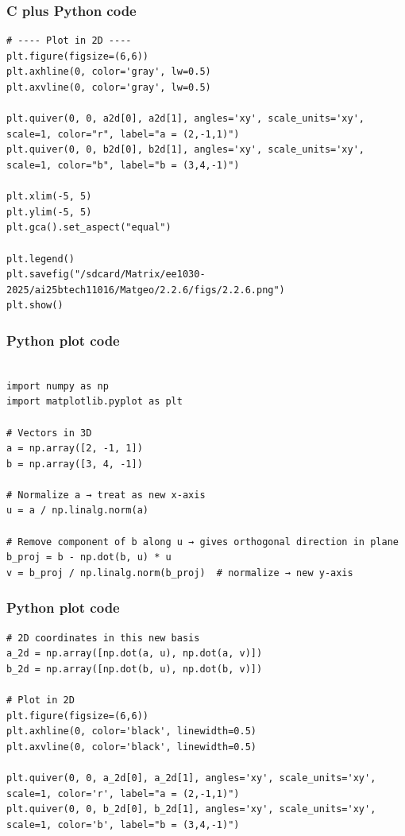 \documentclass{beamer}
\begin{document}
\begin{frame}[fragile]
    \frametitle{C plus Python code}
    \begin{lstlisting}
# ---- Plot in 2D ----
plt.figure(figsize=(6,6))
plt.axhline(0, color='gray', lw=0.5)
plt.axvline(0, color='gray', lw=0.5)

plt.quiver(0, 0, a2d[0], a2d[1], angles='xy', scale_units='xy', scale=1, color="r", label="a = (2,-1,1)")
plt.quiver(0, 0, b2d[0], b2d[1], angles='xy', scale_units='xy', scale=1, color="b", label="b = (3,4,-1)")

plt.xlim(-5, 5)
plt.ylim(-5, 5)
plt.gca().set_aspect("equal")

plt.legend()
plt.savefig("/sdcard/Matrix/ee1030-2025/ai25btech11016/Matgeo/2.2.6/figs/2.2.6.png")
plt.show()
\end{lstlisting}
 
\end{frame}
\begin{frame}[fragile]
    \frametitle{Python plot code}
    \begin{lstlisting}

import numpy as np
import matplotlib.pyplot as plt

# Vectors in 3D
a = np.array([2, -1, 1])
b = np.array([3, 4, -1])

# Normalize a → treat as new x-axis
u = a / np.linalg.norm(a)

# Remove component of b along u → gives orthogonal direction in plane
b_proj = b - np.dot(b, u) * u
v = b_proj / np.linalg.norm(b_proj)  # normalize → new y-axis
\end{lstlisting}
 
\end{frame}
\begin{frame}[fragile]
    \frametitle{Python plot code}
    \begin{lstlisting}
# 2D coordinates in this new basis
a_2d = np.array([np.dot(a, u), np.dot(a, v)])
b_2d = np.array([np.dot(b, u), np.dot(b, v)])

# Plot in 2D
plt.figure(figsize=(6,6))
plt.axhline(0, color='black', linewidth=0.5)
plt.axvline(0, color='black', linewidth=0.5)

plt.quiver(0, 0, a_2d[0], a_2d[1], angles='xy', scale_units='xy', scale=1, color='r', label="a = (2,-1,1)")
plt.quiver(0, 0, b_2d[0], b_2d[1], angles='xy', scale_units='xy', scale=1, color='b', label="b = (3,4,-1)")
\end{lstlisting}
 
\end{frame}
\end{document}
